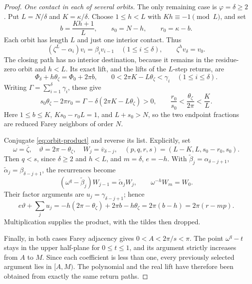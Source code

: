 \documentclass[11pt,a4paper]{article}
\theoremstyle{definition}
\theoremstyle{remark}
\numberwithin{equation}{section}
\begin{document}
\begin{proof}
\emph{One contact in each of several orbits.} The only remaining case is $\varphi=\delta\ge2$. Put $L=N/\delta$ and $K=\kappa/\delta$. Choose $1\le h<L$ with $Kh\equiv-1\pmod L$, and set
\[
 b=\frac{Kh+1}{L},\qquad s_0=N-h,\qquad r_0=\kappa-b.
\]
Each orbit has length $L$ and just one interior contact. Thus
\begin{equation}\label{eq:orbit-product}
 (\zeta^L-\alpha_i)v_i=\beta_i v_{i-1}\quad(1\le i\le\delta),
 \qquad \zeta^h v_\delta=v_0.
\end{equation}
The closing path has no interior destination, because it remains in the residue-zero orbit and $h<L$. Its exact lift, and the lifts of the $L$-step returns, are
\[
 \Phi_\delta+h\theta_\zeta=\Phi_0+2\pi b,
 \qquad 0<2\pi K-L\theta_\zeta<\gamma_i\quad(1\le i\le\delta).
\]
Writing $\Gamma=\sum_{i=1}^\delta\gamma_i$, these give
\[
 s_0\theta_\zeta-2\pi r_0
 =\Gamma-\delta(2\pi K-L\theta_\zeta)>0,
 \qquad \frac{r_0}{s_0}<\frac{\theta_\zeta}{2\pi}<\frac KL.
\]
Here $1\le b\le K$, $Ks_0-r_0L=1$, and $L+s_0>N$, so the two endpoint fractions are reduced Farey neighbors of order $N$.

Conjugate \eqref{eq:orbit-product} and reverse its list. Explicitly, set
\[
 \omega=\overline\zeta,\quad\vartheta=2\pi-\theta_\zeta,\quad
 W_j=\overline v_{\delta-j},\quad
 (p,q,r,s)=(L-K,L,s_0-r_0,s_0).
\]
Then $q<s$, since $\delta\ge2$ and $h<L$, and $m=\delta$, $e=-h$. With $\widetilde\beta_j=\alpha_{\delta-j+1}$, $\widetilde\alpha_j=\beta_{\delta-j+1}$, the recurrences become
\[
 (\omega^q-\widetilde\beta_j)W_{j-1}=\widetilde\alpha_jW_j,
 \qquad \omega^{-h}W_m=W_0.
\]
Their factor arguments are $u_j=\gamma_{\delta-j+1}$; hence
\[
 e\vartheta+\sum_j u_j
 =-h(2\pi-\theta_\zeta)+2\pi b-h\theta_\zeta
 =2\pi(b-h)=2\pi(r-mp).
\]
Multiplication supplies the product, with the tildes then dropped.

Finally, in both cases Farey adjacency gives $0<A<2\pi/s<\pi$. The point $\omega^q-t$ stays in the upper half-plane for $0\le t\le1$, and its argument strictly increases from $A$ to $M$. Since each coefficient is less than one, every previously selected argument lies in $[A,M)$. The polynomial and the real lift have therefore been obtained from exactly the same return paths.
\end{proof}
\end{document}
